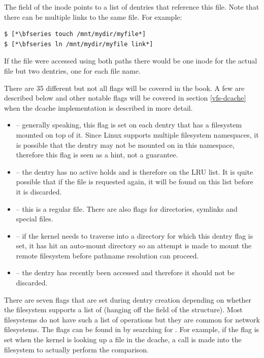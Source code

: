 \noindent
The  field of the inode points to a list of dentries that reference this file. Note that there can be multiple links to the same file. For example:

\begin{lstlisting}
$ [*\bfseries touch /mnt/mydir/myfile*]
$ [*\bfseries ln /mnt/mydir/myfile link*]
\end{lstlisting}

\noindent
If the file were accessed using both paths there would be one inode for the actual file but two dentries, one for each file name. 

There are 35 different  but not all flags will be covered in the book. A few are described below and other notable flags will be covered in section \ref{vfs-dcache} when the dcache implementation is described in more detail.

\begin{itemize}
	\item {} -- generally speaking, this flag is set on each dentry that has a filesystem mounted on 
		top of it.  Since Linux supports multiple filesystem namespaces, it is possible that the dentry may not be mounted 
		on in this namespace, therefore this flag is seen as a hint, not a guarantee.
	\item {} -- the dentry has no active holds and is therefore on the LRU list. It is quite possible
		that if the file is requested again, it will be found on this list before it is discarded.
	\item {} -- this is a regular file. There are also flags for directories, symlinks 
		and special files.
	\item {} -- if the kernel needs to traverse into a directory for which this dentry flag
		is set, it has hit an auto-mount directory so an attempt is made to mount the remote filesystem before 
		pathname resolution can proceed.
	\item {} -- the dentry has recently been accessed and therefore it should not be discarded.
\end{itemize}

\noindent
There are seven flags that are set during dentry creation depending on whether the filesystem supports a list of  (hanging off the  field of the  structure). Most filesystems do not have such a list of operations but they are common for network filesystems. The flags can be found in  by searching for . For example, if the  flag is set when the kernel is looking up a file
in the dcache, a call is made into the filesystem to actually perform the comparison.

